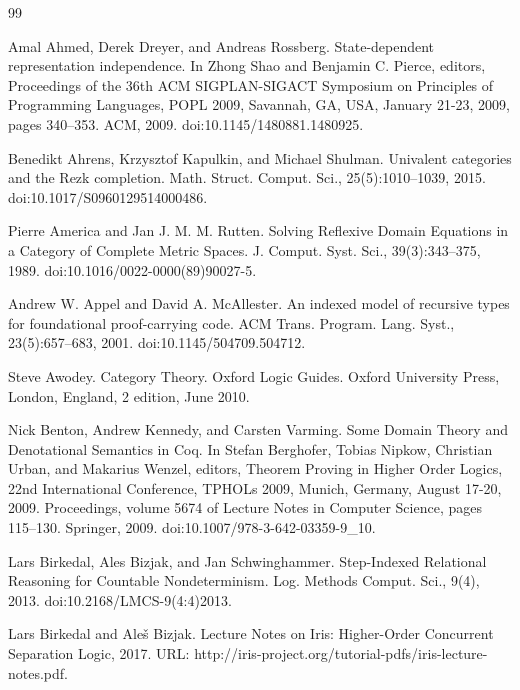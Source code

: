\begin{thebibliography}{99}
\par\noindent    Amal Ahmed, Derek Dreyer, and Andreas Rossberg.  State-dependent representation independence.  In Zhong Shao and Benjamin C. Pierce, editors, Proceedings of the 36th ACM SIGPLAN-SIGACT Symposium on Principles of Programming Languages, POPL 2009, Savannah, GA, USA, January 21-23, 2009, pages 340–353. ACM, 2009.  doi:10.1145/1480881.1480925.  

\par\noindent    Benedikt Ahrens, Krzysztof Kapulkin, and Michael Shulman.  Univalent categories and the Rezk completion.  Math. Struct. Comput. Sci., 25(5):1010–1039, 2015.  doi:10.1017/S0960129514000486.  

\par\noindent    Pierre America and Jan J. M. M. Rutten.  Solving Reflexive Domain Equations in a Category of Complete Metric Spaces.  J. Comput. Syst. Sci., 39(3):343–375, 1989.  doi:10.1016/0022-0000(89)90027-5.  

\par\noindent    Andrew W. Appel and David A. McAllester.  An indexed model of recursive types for foundational proof-carrying code.  ACM Trans. Program. Lang. Syst., 23(5):657–683, 2001.  doi:10.1145/504709.504712.  

\par\noindent    Steve Awodey.  Category Theory.  Oxford Logic Guides. Oxford University Press, London, England, 2 edition, June 2010.  

\par\noindent    Nick Benton, Andrew Kennedy, and Carsten Varming.  Some Domain Theory and Denotational Semantics in Coq.  In Stefan Berghofer, Tobias Nipkow, Christian Urban, and Makarius Wenzel, editors, Theorem Proving in Higher Order Logics, 22nd International Conference, TPHOLs 2009, Munich, Germany, August 17-20, 2009. Proceedings, volume 5674 of Lecture Notes in Computer Science, pages 115–130. Springer, 2009.  doi:10.1007/978-3-642-03359-9\_10.  

\par\noindent    Lars Birkedal, Ales Bizjak, and Jan Schwinghammer.  Step-Indexed Relational Reasoning for Countable Nondeterminism.  Log. Methods Comput. Sci., 9(4), 2013.  doi:10.2168/LMCS-9(4:4)2013.  

\par\noindent    Lars Birkedal and Aleš Bizjak.  Lecture Notes on Iris: Higher-Order Concurrent Separation Logic, 2017.  URL: http://iris-project.org/tutorial-pdfs/iris-lecture-notes.pdf.  


\end{thebibliography}
